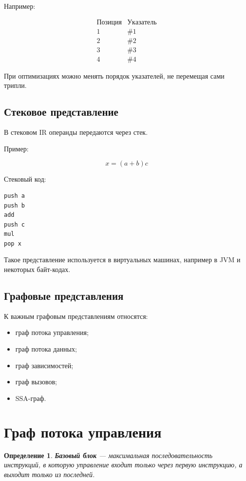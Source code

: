 \documentclass[12pt,a4paper]{article}
\newtheorem{definition}{Определение}
\begin{document}
Например:

\[
\begin{array}{c|c}
Позиция & Указатель \\
\hline
1 & \#1 \\
2 & \#2 \\
3 & \#3 \\
4 & \#4
\end{array}
\]

При оптимизациях можно менять порядок указателей, не перемещая сами трипли.

\subsection{Стековое представление}

В стековом IR операнды передаются через стек.

Пример:

\[
x = (a+b)c
\]

Стековый код:

\begin{lstlisting}
push a
push b
add
push c
mul
pop x
\end{lstlisting}

Такое представление используется в виртуальных машинах, например в JVM и некоторых байт-кодах.

\subsection{Графовые представления}

К важным графовым представлениям относятся:
\begin{itemize}
    \item граф потока управления;
    \item граф потока данных;
    \item граф зависимостей;
    \item граф вызовов;
    \item SSA-граф.
\end{itemize}

\section{Граф потока управления}

\begin{definition}
\textbf{Базовый блок} --- максимальная последовательность инструкций, в которую управление входит только через первую инструкцию, а выходит только из последней.
\end{definition}
\end{document}
